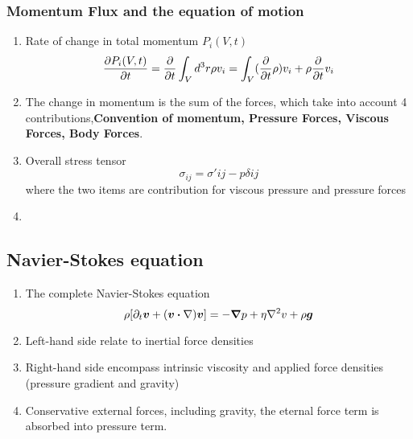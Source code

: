 \documentclass[12pt,a4paper]{article}
\begin{document}
        \subsubsection{Momentum Flux and the equation of motion}
            \begin{enumerate}
                \item Rate of change in total momentum $P_i(V,t)$
                \begin{equation}
                    \pdv{P_i(V,t)}{t}=\pdv{t} \int_{V}d^3r\rho v_i=\int_{V}(\pdv{t}\rho) v_i+\rho\pdv{t}v_i
                \end{equation}
                \item The change in momentum is the sum of the forces, which take into account 4 contributions,\textbf{Convention of momentum, Pressure Forces, Viscous Forces, Body Forces}.
                \item Overall stress tensor 
                \begin{equation}
                    \sigma_{ij}=\sigma' {ij} - p\delta{ij}
                \end{equation}
                where the two items are contribution for viscous pressure and pressure forces
                \item 
            \end{enumerate}
        \subsection{Navier-Stokes equation}
            \begin{enumerate}
                \item The complete Navier-Stokes equation
                \begin{equation}
                    \rho [\partial_t\vb*{v} + (\vb*{v}\dotproduct \nabla)\vb*{v}]= - \grad{p} +\eta\laplacian{v}+\rho\vb*{g}
                \end{equation}
                \item Left-hand side relate to inertial force densities
                \item Right-hand side encompass intrinsic viscosity and applied force densities (pressure gradient and gravity)
                \item Conservative external forces, including gravity, the eternal force term is absorbed into pressure term.
            \end{enumerate}
\end{document}
